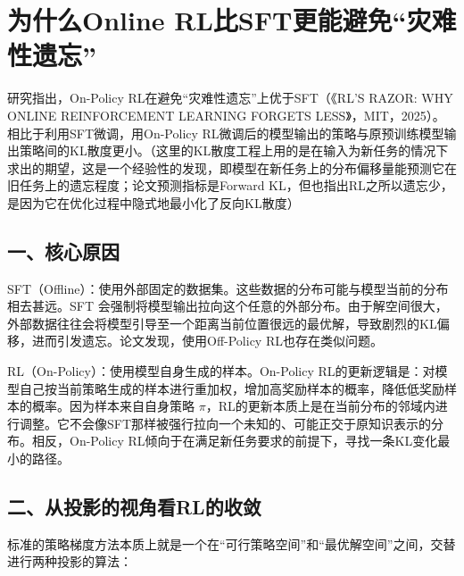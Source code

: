 \setcounter{section}{8}

\hypertarget{ux4e3aux4ec0ux4e48online-rlux6bd4sftux66f4ux80fdux907fux514dux707eux96beux6027ux9057ux5fd8}{%
\section{为什么Online RL比SFT更能避免``灾难性遗忘''}\label{ux4e3aux4ec0ux4e48online-rlux6bd4sftux66f4ux80fdux907fux514dux707eux96beux6027ux9057ux5fd8}}

研究指出，On-Policy RL在避免``灾难性遗忘''上优于SFT（《RL'S RAZOR: WHY ONLINE REINFORCEMENT LEARNING FORGETS LESS》，MIT，2025）。相比于利用SFT微调，用On-Policy RL微调后的模型输出的策略与原预训练模型输出策略间的KL散度更小。（这里的KL散度工程上用的是在输入为新任务的情况下求出的期望，这是一个经验性的发现，即模型在新任务上的分布偏移量能预测它在旧任务上的遗忘程度；论文预测指标是Forward KL，但也指出RL之所以遗忘少，是因为它在优化过程中隐式地最小化了反向KL散度）

\hypertarget{ux4e00ux6838ux5fc3ux539fux56e0}{%
\subsection{一、核心原因}\label{ux4e00ux6838ux5fc3ux539fux56e0}}

SFT（Offline）：使用外部固定的数据集。这些数据的分布可能与模型当前的分布相去甚远。SFT 会强制将模型输出拉向这个任意的外部分布。由于解空间很大，外部数据往往会将模型引导至一个距离当前位置很远的最优解，导致剧烈的KL偏移，进而引发遗忘。论文发现，使用Off-Policy RL也存在类似问题。

RL（On-Policy）：使用模型自身生成的样本。On-Policy RL的更新逻辑是：对模型自己按当前策略生成的样本进行重加权，增加高奖励样本的概率，降低低奖励样本的概率。因为样本来自自身策略 \(\pi\)，RL的更新本质上是在当前分布的邻域内进行调整。它不会像SFT那样被强行拉向一个未知的、可能正交于原知识表示的分布。相反，On-Policy RL倾向于在满足新任务要求的前提下，寻找一条KL变化最小的路径。

\hypertarget{ux4e8cux4eceux6295ux5f71ux7684ux89c6ux89d2ux770brlux7684ux6536ux655b}{%
\subsection{二、从投影的视角看RL的收敛}\label{ux4e8cux4eceux6295ux5f71ux7684ux89c6ux89d2ux770brlux7684ux6536ux655b}}

标准的策略梯度方法本质上就是一个在``可行策略空间''和``最优解空间''之间，交替进行两种投影的算法：

